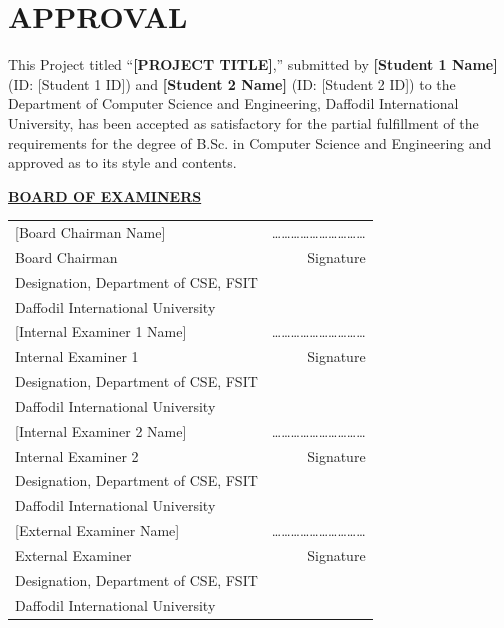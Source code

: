 \setcounter{page}{1}

\cleardoublepage
\section*{APPROVAL}

This Project titled ``\textbf{[PROJECT TITLE]},'' submitted by \textbf{[Student 1 Name]} (ID: [Student 1 ID]) and \textbf{[Student 2 Name]} (ID: [Student 2 ID]) to the Department of Computer Science and Engineering, Daffodil International University, has been accepted as satisfactory for the partial fulfillment of the requirements for the degree of B.Sc. in Computer Science and Engineering and approved as to its style and contents.

\vspace{1cm}
\noindent\textbf{\underline{BOARD OF EXAMINERS}}

\vspace{0.8cm}
\begin{table}[H]
\centering
\begin{tabular}{p{8.5cm}r}
{[Board Chairman Name]} & \dots\dots\dots\dots\dots\dots\dots\dots\dots\dots \\
Board Chairman & Signature \\
Designation, Department of CSE, FSIT & \\
Daffodil International University & \\[0.8cm]

{[Internal Examiner 1 Name]} & \dots\dots\dots\dots\dots\dots\dots\dots\dots\dots \\
Internal Examiner 1 & Signature \\
Designation, Department of CSE, FSIT & \\
Daffodil International University & \\[0.8cm]

{[Internal Examiner 2 Name]} & \dots\dots\dots\dots\dots\dots\dots\dots\dots\dots \\
Internal Examiner 2 & Signature \\
Designation, Department of CSE, FSIT & \\
Daffodil International University & \\[0.8cm]

{[External Examiner Name]} & \dots\dots\dots\dots\dots\dots\dots\dots\dots\dots \\
External Examiner & Signature \\
Designation, Department of CSE, FSIT & \\
Daffodil International University & \\
\end{tabular}
\end{table}

